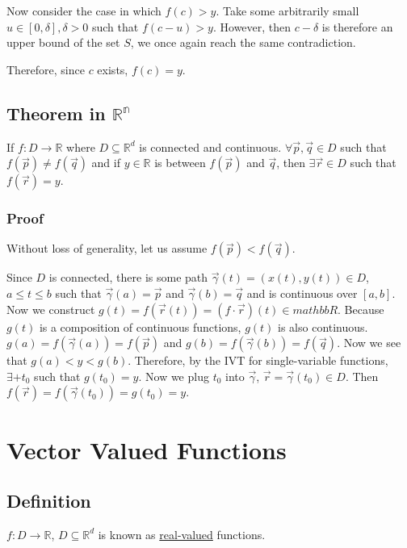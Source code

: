 \documentclass[11 pt, twoside]{article}
\begin{document}
Now consider the case in which $f(c) > y$. Take some arbitrarily small $u \in
[0, \delta], \delta > 0$ such that $f(c - u) > y$. However, then $c - \delta$ is
therefore an upper bound of the set $S$, we once again reach the same
contradiction.

Therefore, since $c$ exists, $f(c) = y$.

\subsection{Theorem in $\mathbb{R^n}$}

If $f : D \to \mathbb{R}$ where $D \subseteq \mathbb{R}^d$ is connected
and continuous. $\forall \vec{p}, \vec{q} \in D$ such that $f(\vec{p}) \neq
f(\vec{q})$ and if $y \in \mathbb{R}$ is between $f(\vec{p})$ and $\vec{q}$,
then $\exists \vec{r} \in D$ such that $f(\vec{r}) = y$.

\subsubsection{Proof}

Without loss of generality, let us assume $f(\vec{p}) < f(\vec{q})$.

Since $D$ is connected, there is some path $\vec{\gamma}(t) = (x(t), y(t)) \in
D$, $a \leq t \leq b$ such that $\vec{\gamma}(a) = \vec{p}$ and $\vec{\gamma}(b)
= \vec{q}$ and is continuous over $[a, b]$. Now we construct $g(t) =
f(\vec{r}(t)) = (f\cdot\vec{r})(t) \in mathbb{R}$. Because $g(t)$ is a
composition of continuous functions, $g(t)$ is also continuous. $g(a) =
f(\vec{\gamma}(a)) = f(\vec{p})$ and $g(b) = f(\vec{\gamma}(b)) = f(\vec{q})$.
Now we see that $g(a) < y < g(b)$. Therefore, by the IVT for single-variable
functions, $\exists+t_0$ such that $g(t_0) = y$. Now we plug $t_0$ into
$\vec{\gamma}$, $\vec{r} = \vec{\gamma}(t_0) \in D$. Then $f(\vec{r}) =
f(\vec{\gamma}(t_0)) = g(t_0) = y$.

\section{Vector Valued Functions}

\subsection{Definition}

$f: D \to \mathbb{R}$, $D \subseteq \mathbb{R}^d$ is known as
\underline{real-valued} functions.
\end{document}
